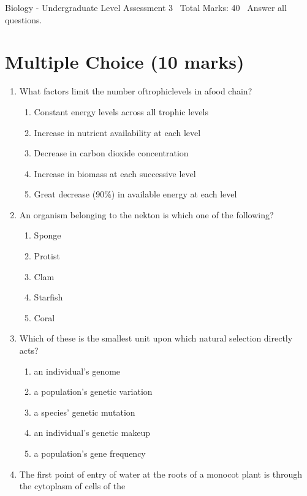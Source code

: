 \documentclass[12pt]{article}
\begin{document}
\begin{center}
Biology - Undergraduate Level Assessment 3 \
Total Marks: 40 \
Answer all questions.
\end{center}

\section*{Multiple Choice (10 marks)}
\begin{enumerate}[label=\arabic*.]
\item What factors limit the number oftrophiclevels in afood chain?
\begin{enumerate}[label=(\alph*)]
    \item Constant energy levels across all trophic levels
    \item Increase in nutrient availability at each level
    \item Decrease in carbon dioxide concentration
    \item Increase in biomass at each successive level
    \item Great decrease (90\%) in available energy at each level
\end{enumerate}
\item An organism belonging to the nekton is which one of the following?
\begin{enumerate}[label=(\alph*)]
    \item Sponge
    \item Protist
    \item Clam
    \item Starfish
    \item Coral
\end{enumerate}
\item Which of these is the smallest unit upon which natural selection directly acts?
\begin{enumerate}[label=(\alph*)]
    \item an individual's genome
    \item a population's genetic variation
    \item a species' genetic mutation
    \item an individual's genetic makeup
    \item a population's gene frequency
\end{enumerate}
\item The first point of entry of water at the roots of a monocot plant is through the cytoplasm of cells of the
\begin{enumerate}[label=(\alph*)]

\end{enumerate}
\end{enumerate}
\end{document}

